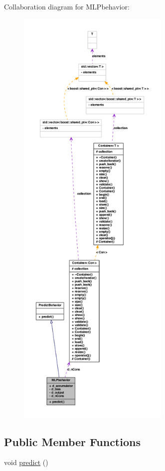 Collaboration diagram for MLPbehavior:
\nopagebreak
\begin{figure}[H]
\begin{center}
\leavevmode
\includegraphics[height=600pt]{class_m_l_pbehavior__coll__graph}
\end{center}
\end{figure}
\subsection*{Public Member Functions}
\begin{DoxyCompactItemize}
\item 
void \hyperlink{class_m_l_pbehavior_aaff94adc3577cda9e48d8da925b0ffbf}{predict} ()
\end{DoxyCompactItemize}
